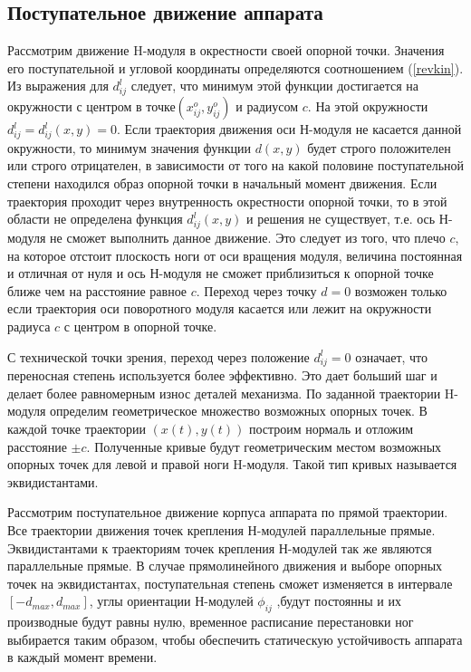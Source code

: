 \subsection{Поступательное движение аппарата}
Рассмотрим движение H-модуля в окрестности своей опорной точки. Значения его поступательной и угловой координаты определяются соотношением (\ref{revkin}). Из выражения для $d^l_{ij}$ следует, что минимум этой функции достигается на окружности с центром в точке$(x^o_{ij},y^o_{ij})$ и радиусом $c$. На этой окружности $d^l_{ij} = d^l_{ij}(x,y) = 0$. Если траектория движения оси Н-модуля не касается данной окружности, то минимум значения функции $d(x,y)$ будет строго положителен или строго отрицателен, в зависимости от того на какой половине поступательной степени находился образ опорной точки в начальный момент движения. Если траектория проходит через внутренность окрестности опорной точки, то в этой области не определена функция $d^l_{ij}(x,y)$ и решения не существует, т.е. ось Н-модуля не сможет выполнить данное движение. Это следует из того, что плечо $c$, на которое отстоит плоскость ноги от оси вращения модуля, величина постоянная и отличная от нуля и ось Н-модуля не сможет приблизиться к опорной точке ближе чем на расстояние равное $c$. Переход через точку $d = 0$ возможен только если траектория оси поворотного модуля касается или лежит на окружности радиуса $c$ с центром в опорной точке.

С технической точки зрения, переход через положение $d^l_{ij}=0$ означает, что переносная степень используется более эффективно. Это дает больший шаг и делает более равномерным износ деталей механизма.
По заданной траектории H-модуля определим геометрическое множество возможных опорных точек. В каждой точке траектории $(x(t),y(t))$ построим нормаль и отложим расстояние $\pm c$. Полученные кривые будут геометрическим местом возможных опорных точек для левой и правой ноги H-модуля. Такой тип кривых называется эквидистантами.

Рассмотрим поступательное движение корпуса аппарата по прямой траектории. Все траектории движения точек крепления Н-модулей параллельные прямые. Эквидистантами к траекториям точек крепления Н-модулей так же являются параллельные прямые. В случае прямолинейного движения и выборе опорных точек на эквидистантах, поступательная степень сможет изменяется в интервале $[-d_{max},d_{max}]$, углы ориентации Н-модулей $\phi_{ij}$ ,будут постоянны и их производные будут равны нулю, временное расписание перестановки ног выбирается таким образом, чтобы обеспечить статическую устойчивость аппарата в каждый момент времени.

